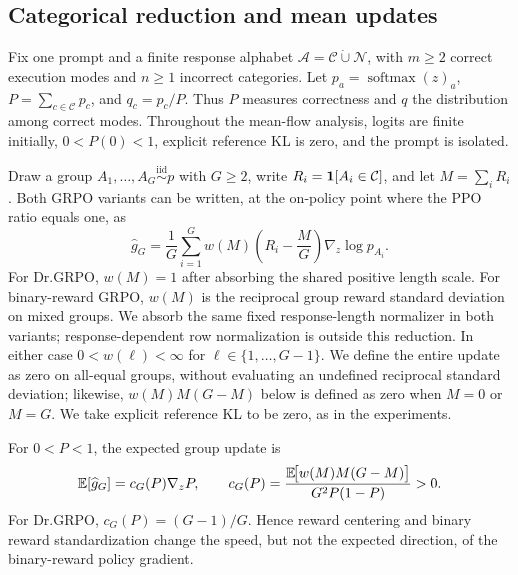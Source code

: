 \subsection{Categorical reduction and mean updates}
\label{app:theory-grpo-mean}

Fix one prompt and a finite response alphabet
$\mathcal A=\mathcal C\mathbin{\dot\cup}\mathcal N$, with $m\ge2$ correct
execution modes and $n\ge1$ incorrect categories. Let
$p_a=\operatorname{softmax}(z)_a$, $P=\sum_{c\in\mathcal C}p_c$, and
$q_c=p_c/P$. Thus $P$ measures correctness and $q$ the distribution among
correct modes. Throughout the mean-flow analysis, logits are finite initially,
$0<P(0)<1$, explicit reference KL is zero, and the prompt is isolated.

Draw a group $A_1,\ldots,A_G\stackrel{\mathrm{iid}}{\sim}p$ with $G\ge2$,
write $R_i=\mathbf 1[A_i\in\mathcal C]$, and let $M=\sum_iR_i$. Both GRPO variants
can be written, at the on-policy point where the PPO ratio equals one, as
\begin{equation}
  \widehat g_G
  =\frac1G\sum_{i=1}^G
   w(M)\left(R_i-\frac{M}{G}\right)\nabla_z\log p_{A_i}.
  \label{eq:group-estimator}
\end{equation}
For Dr.GRPO, $w(M)=1$ after absorbing the shared positive length scale. For
binary-reward GRPO, $w(M)$ is the reciprocal group reward standard deviation
on mixed groups. We absorb the same fixed response-length normalizer in both
variants; response-dependent row normalization is outside this reduction.
In either case $0<w(\ell)<\infty$ for $\ell\in\{1,\ldots,G-1\}$.
We define the entire update as zero on all-equal groups, without evaluating an
undefined reciprocal standard deviation; likewise, $w(M)M(G-M)$ below is
defined as zero when $M=0$ or $M=G$. We take explicit reference KL to be zero, as
in the experiments.

\begin{lemma}
\label{lem:grpo-mean}
For $0<P<1$, the expected group update is
\begin{equation}
  \mathbb E[\widehat g_G]
  =c_G(P)\nabla_z P,
  \qquad
  c_G(P)=
  \frac{\mathbb E\!\big[w(M)M(G-M)\big]}{G^2P(1-P)}>0.
  \label{eq:expected-group-gradient}
\end{equation}
For Dr.GRPO, $c_G(P)=(G-1)/G$. Hence reward centering and binary reward
standardization change the speed, but not the expected direction, of the
binary-reward policy gradient.
\end{lemma}


